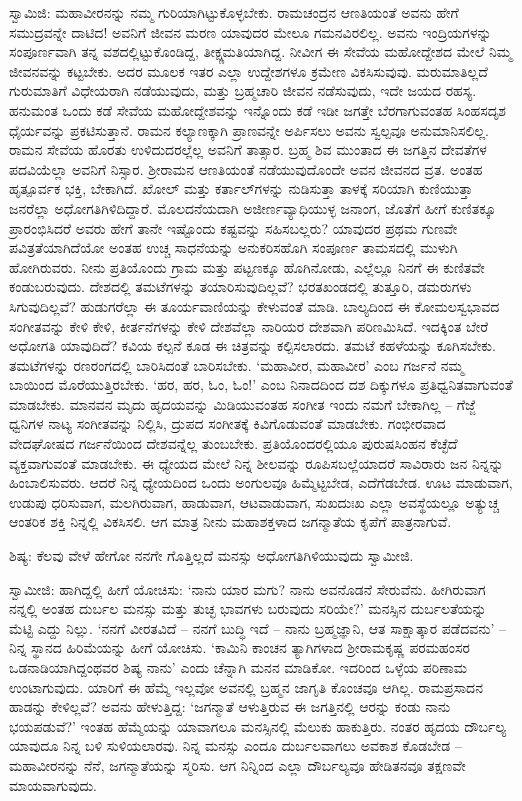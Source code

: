 ಸ್ವಾಮಿಜಿ: ಮಹಾವೀರನನ್ನು ನಮ್ಮ ಗುರಿಯಾಗಿಟ್ಟುಕೊಳ್ಳಬೇಕು. ರಾಮಚಂದ್ರನ ಆಣತಿಯಂತೆ ಅವನು ಹೇಗೆ ಸಮುದ್ರವನ್ನೇ ದಾಟಿದ! ಅವನಿಗೆ ಜೀವನ ಮರಣ ಯಾವುದರ ಮೇಲೂ ಗಮನವಿರಲಿಲ್ಲ. ಅವನು ಇಂದ್ರಿಯಗಳನ್ನು ಸಂಪೂರ್ಣವಾಗಿ ತನ್ನ ವಶದಲ್ಲಿಟ್ಟುಕೊಂಡಿದ್ದ, ತೀಕ್ಷ್ಣಮತಿಯಾಗಿದ್ದ. ನೀವೀಗ ಈ ಸೇವೆಯ ಮಹೋದ್ದೇಶದ ಮೇಲೆ ನಿಮ್ಮ ಜೀವನವನ್ನು ಕಟ್ಟಬೇಕು. ಅದರ ಮೂಲಕ ಇತರ ಎಲ್ಲಾ ಉದ್ದೇಶಗಳೂ ಕ್ರಮೇಣ ವಿಕಸಿಸುವುವು. ಮರುಮಾತಿಲ್ಲದೆ ಗುರುಮಾತಿಗೆ ವಿಧೇಯರಾಗಿ ನಡೆಯುವುದು, ಮತ್ತು ಬ್ರಹ್ಮಚಾರಿ ಜೀವನ ನಡೆಸುವುದು, ಇದೇ ಜಯದ ರಹಸ್ಯ. ಹನುಮಂತ ಒಂದು ಕಡೆ ಸೇವೆಯ ಮಹೋದ್ದೇಶವನ್ನು ಇನ್ನೊಂದು ಕಡೆ ಇಡೀ ಜಗತ್ತೇ ಬೆರಗಾಗುವಂತಹ ಸಿಂಹಸದೃಶ ಧೈರ್ಯವನ್ನು ಪ್ರಕಟಿಸುತ್ತಾನೆ. ರಾಮನ ಕಲ್ಯಾಣಕ್ಕಾಗಿ ಪ್ರಾಣವನ್ನೇ ಅರ್ಪಿಸಲು ಅವನು ಸ್ವಲ್ಪವೂ ಅನುಮಾನಿಸಲಿಲ್ಲ. ರಾಮನ ಸೇವೆಯ ಹೊರತು ಉಳಿದುದರಲ್ಲೆಲ್ಲ ಅವನಿಗೆ ತಾತ್ಸಾರ. ಬ್ರಹ್ಮ ಶಿವ ಮುಂತಾದ ಈ ಜಗತ್ತಿನ ದೇವತೆಗಳ ಪದವಿಯೆಲ್ಲಾ ಅವನಿಗೆ ನಿಸ್ಸಾರ. ಶ‍್ರೀರಾಮನ ಆಣತಿಯಂತೆ ನಡೆಯುವುದೊಂದೇ ಅವನ ಜೀವನದ ವ್ರತ. ಅಂತಹ ಹೃತ್ಪೂರ್ವಕ ಭಕ್ತಿ, ಬೇಕಾಗಿದೆ. ಖೋಲ್ ಮತ್ತು ಕರ್ತಾಲ್‌ಗಳನ್ನು ನುಡಿಸುತ್ತಾ ತಾಳಕ್ಕೆ ಸರಿಯಾಗಿ ಕುಣಿಯುತ್ತಾ ಜನರೆಲ್ಲಾ ಅಧೋಗತಿಗಿಳಿದಿದ್ದಾರೆ. ಮೊಲದನೆಯದಾಗಿ ಅಜೀರ್ಣವ್ಯಾಧಿಯುಳ್ಳ ಜನಾಂಗ, ಜೊತೆಗೆ ಹೀಗೆ ಕುಣಿತಕ್ಕೂ ಪ್ರಾರಂಭಿಸಿದರೆ ಅವರು ಹೇಗೆ ತಾನೇ ಇಷ್ಟೊಂದು ಕಷ್ಟವನ್ನು ಸಹಿಸಬಲ್ಲರು? ಯಾವುದರ ಪ್ರಥಮ ಗುಣವೇ ಪವಿತ್ರತೆಯಾಗಿದೆಯೋ ಅಂತಹ ಉಚ್ಚ ಸಾಧನೆಯನ್ನು ಅನುಕರಿಸಹೊಗಿ ಸಂಪೂರ್ಣ ತಾಮಸದಲ್ಲಿ ಮುಳುಗಿ ಹೋಗಿರುವರು. ನೀನು ಪ್ರತಿಯೊಂದು ಗ್ರಾಮ ಮತ್ತು ಪಟ್ಟಣಕ್ಕೂ ಹೊಗಿನೋಡು, ಎಲ್ಲೆಲ್ಲೂ ನಿನಗೆ ಈ ಕುಣಿತವೇ ಕಂಡುಬರುವುದು. ದೇಶದಲ್ಲಿ ತಮಟೆಗಳನ್ನು ತಯಾರಿಸುವುದಿಲ್ಲವೆ? ಭರತಖಂಡದಲ್ಲಿ ತುತ್ತೂರಿ, ಡಮರುಗಳು ಸಿಗುವುದಿಲ್ಲವೆ? ಹುಡುಗರೆಲ್ಲಾ ಈ ತೂರ್ಯವಾಣಿಯನ್ನು ಕೇಳುವಂತೆ ಮಾಡಿ. ಬಾಲ್ಯದಿಂದ ಈ ಕೋಮಲಸ್ವಭಾವದ ಸಂಗೀತವನ್ನು ಕೇಳಿ ಕೇಳಿ, ಕೀರ್ತನೆಗಳನ್ನು ಕೇಳಿ ದೇಶವೆಲ್ಲಾ ನಾರಿಯರ ದೇಶವಾಗಿ ಪರಿಣಮಿಸಿದೆ. ಇದಕ್ಕಿಂತ ಬೇರೆ ಅಧೋಗತಿ ಯಾವುದಿದೆ? ಕವಿಯ ಕಲ್ಪನೆ ಕೂಡ ಈ ಚಿತ್ರವನ್ನು ಕಲ್ಪಿಸಲಾರದು. ತಮಟೆ ಕಹಳೆಯನ್ನು ಕೂಗಿಸಬೇಕು. ತಮಟೆಗಳನ್ನು ರಣರಂಗದಲ್ಲಿ ಬಾರಿಸಿದಂತೆ ಬಾರಿಸಬೇಕು. ‘ಮಹಾವೀರ, ಮಹಾವೀರ’ ಎಂಬ ಗರ್ಜನೆ ನಮ್ಮ ಬಾಯಿಂದ ಮೊರೆಯುತ್ತಿರಬೇಕು. ‘ಹರ, ಹರ, ಓಂ, ಓಂ!’ ಎಂಬ ನಿನಾದದಿಂದ ದಶ ದಿಕ್ಕುಗಳೂ ಪ್ರತಿಧ್ವನಿತವಾಗುವಂತೆ ಮಾಡಬೇಕು. ಮಾನವನ ಮೃದು ಹೃದಯವನ್ನು ಮಿಡಿಯುವಂತಹ ಸಂಗೀತ ಇಂದು ನಮಗೆ ಬೇಕಾಗಿಲ್ಲ – ಗೆಜ್ಜೆ ಧ್ವನಿಗಳ ನಾಟ್ಯ ಸಂಗೀತವನ್ನು ನಿಲ್ಲಿಸಿ, ದ್ರುಪದ ಸಂಗೀತಕ್ಕೆ ಕಿವಿಗೊಡುವಂತೆ ಮಾಡಬೇಕು. ಗಂಭೀರವಾದ ವೇದಘೋಷದ ಗರ್ಜನೆಯಿಂದ ದೇಶವನ್ನೆಲ್ಲ ತುಂಬಬೇಕು. ಪ್ರತಿಯೊಂದರಲ್ಲಿಯೂ ಪುರುಷಸಿಂಹನ ಕೆಚ್ಛೆದೆ ವ್ಯಕ್ತವಾಗುವಂತೆ ಮಾಡಬೇಕು. ಈ ಧ್ಯೇಯದ ಮೇಲೆ ನಿನ್ನ ಶೀಲವನ್ನು ರೂಪಿಸಬಲ್ಲೆಯಾದರೆ ಸಾವಿರಾರು ಜನ ನಿನ್ನನ್ನು ಹಿಂಬಾಲಿಸುವರು. ಆದರೆ ನಿನ್ನ ಧ್ಯೇಯದಿಂದ ಒಂದು ಅಂಗುಲವೂ ಹಿಮ್ಮೆಟ್ಟಬೇಡ, ಎದೆಗೆಡಬೇಡ. ಊಟ ಮಾಡುವಾಗ, ಉಡುಪು ಧರಿಸುವಾಗ, ಮಲಗಿರುವಾಗ, ಹಾಡುವಾಗ, ಆಟವಾಡುವಾಗ, ಸುಖದುಃಖ ಎಲ್ಲಾ ಅವಸ್ಥೆಯಲ್ಲೂ ಅತ್ಯುಚ್ಚ ಆಂತರಿಕ ಶಕ್ತಿ ನಿನ್ನಲ್ಲಿ ವಿಕಸಿಸಲಿ. ಆಗ ಮಾತ್ರ ನೀನು ಮಹಾಶಕ್ತಳಾದ ಜಗನ್ಮಾತೆಯ ಕೃಪೆಗೆ ಪಾತ್ರನಾಗುವೆ.

ಶಿಷ್ಯ: ಕೆಲವು ವೇಳೆ ಹೇಗೋ ನನಗೇ ಗೊತ್ತಿಲ್ಲದೆ ಮನಸ್ಸು ಅಧೋಗತಿಗಿಳಿಯುವುದು ಸ್ವಾಮೀಜಿ.

ಸ್ವಾಮೀಜಿ: ಹಾಗಿದ್ದಲ್ಲಿ ಹೀಗೆ ಯೋಚಿಸು: ‘ನಾನು ಯಾರ ಮಗು? ನಾನು ಅವನೊಡನೆ ಸೇರುವೆನು. ಹೀಗಿರುವಾಗ ನನ್ನಲ್ಲಿ ಅಂತಹ ದುರ್ಬಲ ಮನಸ್ಸು ಮತ್ತು ತುಚ್ಛ ಭಾವಗಳು ಬರುವುದು ಸರಿಯೇ?’ ಮನಸ್ಸಿನ ದುರ್ಬಲತೆಯನ್ನು ಮೆಟ್ಟಿ ಎದ್ದು ನಿಲ್ಲು. ‘ನನಗೆ ವೀರತವಿದೆ – ನನಗೆ ಬುದ್ಧಿ ಇದೆ – ನಾನು ಬ್ರಹ್ಮಜ್ಞಾನಿ, ಆತ ಸಾಕ್ಷಾತ್ಕಾರ ಪಡೆದವನು’ – ನಿನ್ನ ಸ್ಥಾನದ ಹಿರಿಮೆಯನ್ನು ಹೀಗೆ ಯೋಚಿಸು. ‘ಕಾಮಿನಿ ಕಾಂಚನ ತ್ಯಾಗಿಗಳಾದ ಶ‍್ರೀರಾಮಕೃಷ್ಣ ಪರಮಹಂಸರ ಒಡನಾಡಿಯಾಗಿದ್ದಂಥವರ ಶಿಷ್ಯ ನಾನು’ ಎಂದು ಚೆನ್ನಾಗಿ ಮನನ ಮಾಡಿಕೋ. ಇದರಿಂದ ಒಳ್ಳೆಯ ಪರಿಣಾಮ ಉಂಟಾಗುವುದು. ಯಾರಿಗೆ ಈ ಹೆಮ್ಮೆ ಇಲ್ಲವೋ ಅವನಲ್ಲಿ ಬ್ರಹ್ಮನ ಜಾಗೃತಿ ಕೊಂಚವೂ ಆಗಿಲ್ಲ. ರಾಮಪ್ರಸಾದನ ಹಾಡನ್ನು ಕೇಳಿಲ್ಲವೆ? ಅವನು ಹೇಳುತ್ತಿದ್ದ: ‘ಜಗನ್ಮಾತೆ ಆಳುತ್ತಿರುವ ಈ ಜಗತ್ತಿನಲ್ಲಿ ಆರನ್ನು ಕಂಡು ನಾನು ಭಯಪಡುವೆ?’ ಇಂತಹ ಹೆಮ್ಮೆಯನ್ನು ಯಾವಾಗಲೂ ಮನಸ್ಸಿನಲ್ಲಿ ಮೆಲುಕು ಹಾಕುತ್ತಿರು. ನಂತರ ಹೃದಯ ದೌರ್ಬಲ್ಯ ಯಾವುದೂ ನಿನ್ನ ಬಳಿ ಸುಳಿಯಲಾರವು. ನಿನ್ನ ಮನಸ್ಸು ಎಂದೂ ದುರ್ಬಲವಾಗಲು ಅವಕಾಶ ಕೊಡಬೇಡ – ಮಹಾವೀರನನ್ನು ನೆನೆ, ಜಗನ್ಮಾತೆಯನ್ನು ಸ್ಮರಿಸು. ಆಗ ನಿನ್ನಿಂದ ಎಲ್ಲಾ ದೌರ್ಬಲ್ಯವೂ ಹೇಡಿತನವೂ ತಕ್ಷಣವೇ ಮಾಯವಾಗುವುದು.

